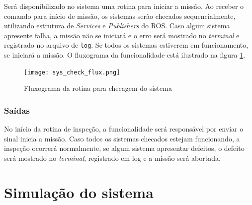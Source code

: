 Será disponibilizado no sistema uma rotina para iniciar a missão. Ao receber o comando para início de missão, os sistemas serão checados sequencialmente, utilizando estrutura de \textit{Services} e \textit{Publishers} do ROS. Caso algum sistema apresente falha, a missão não se iniciará e o erro será mostrado no \textit{terminal} e registrado no arquivo de \verb|log|. Se todos os sistemas estiverem em funcionamento, se iniciará a missão. O fluxograma da funcionalidade está ilustrado na figura \ref{fig:sys_check_flux}.	
\begin{figure}[h]
	\centering
	\texttt{[image: sys\_check\_flux.png]}
	\caption{Fluxograma da rotina para checagem do sistema}
	\label{fig:sys_check_flux}
\end{figure} 


\subsubsection{Saídas}
No início da rotina de inspeção, a funcionalidade será responsável por enviar o sinal inicia a missão. Caso todos os sistemas checados estejam funcionando, a inspeção ocorrerá normalmente, se algum sistema apresentar defeitos, o defeito será mostrado no \textit{terminal}, registrado em log e a missão será abortada.


\section{Simulação do sistema}
\label{sec:sim}




